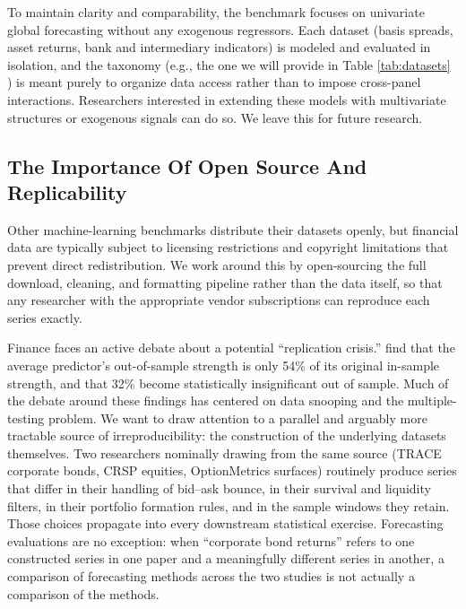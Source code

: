 \documentclass{article}
\begin{document}
To maintain clarity and comparability, the benchmark focuses on univariate global forecasting without any exogenous regressors. Each dataset (basis spreads, asset returns, bank and intermediary indicators) is modeled and evaluated in isolation, and the taxonomy (e.g., the one we will provide in Table \ref{tab:datasets}  ) is meant purely to organize data access rather than to impose cross-panel interactions. Researchers interested in extending these models with multivariate structures or exogenous signals can do so. We leave this for future research.


\subsection{The Importance Of Open Source And Replicability}

Other machine-learning benchmarks distribute their datasets openly, but financial data are typically subject to licensing restrictions and copyright limitations that prevent direct redistribution. We work around this by open-sourcing the full download, cleaning, and formatting pipeline rather than the data itself, so that any researcher with the appropriate vendor subscriptions can reproduce each series exactly.

Finance faces an active debate about a potential ``replication crisis.'' \citet{Jensen2023} find that the average predictor's out-of-sample strength is only 54\% of its original in-sample strength, and that 32\% become statistically insignificant out of sample. Much of the debate around these findings has centered on data snooping and the multiple-testing problem. We want to draw attention to a parallel and arguably more tractable source of irreproducibility: the construction of the underlying datasets themselves. Two researchers nominally drawing from the same source (TRACE corporate bonds, CRSP equities, OptionMetrics surfaces) routinely produce series that differ in their handling of bid--ask bounce, in their survival and liquidity filters, in their portfolio formation rules, and in the sample windows they retain. Those choices propagate into every downstream statistical exercise. Forecasting evaluations are no exception: when ``corporate bond returns'' refers to one constructed series in one paper and a meaningfully different series in another, a comparison of forecasting methods across the two studies is not actually a comparison of the methods.
\end{document}
